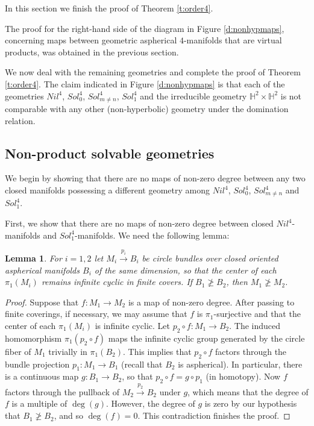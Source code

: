 \documentclass[12pt]{amsart}
\newtheorem{lem}[thm]{Lemma}
\theoremstyle{remark}
\begin{document}
In this section we finish the proof of Theorem \ref{t:order4}. 

The proof for the right-hand side of the diagram in Figure \ref{d:nonhypmaps}, concerning maps between geometric aspherical $4$-manifolds that are virtual products, was obtained in the previous section.

We now deal with the remaining geometries and complete the proof of Theorem \ref{t:order4}. The claim indicated in Figure \ref{d:nonhypmaps} is that
each of the geometries $Nil^4$, $Sol_0^4$, $Sol_{m \neq n}^4$, $Sol_1^4$ and the irreducible geometry $\mathbb{H}^2 \times \mathbb{H}^2$ is not comparable with any other
(non-hyperbolic) geometry under the domination relation.

\subsection{Non-product solvable geometries}

We begin by showing that there are no maps of non-zero degree between any two closed manifolds possessing a different geometry among $Nil^4$, $Sol_0^4$,
$Sol_{m \neq n}^4$ and $Sol_1^4$.

First, we show that there are no maps of non-zero degree between closed $Nil^4$-manifolds and $Sol_1^4$-manifolds. We need the following lemma:

\begin{lem}\label{l:factorizationbundles}
 For $i = 1,2$ let $M_i \stackrel{p_i}\longrightarrow B_i$ be circle bundles over closed oriented aspherical manifolds $B_i$ of the same dimension, so that the
center of each $\pi_1(M_i)$ remains infinite cyclic in finite covers. If $B_1 \ngeq B_2$, then $M_1 \ngeq M_2$. 
\end{lem}
\begin{proof}
 Suppose that $f \colon M_1 \longrightarrow M_2$ is a map of non-zero degree. After passing to finite coverings, if necessary, we may assume that $f$ is
$\pi_1$-surjective and that the center of each $\pi_1(M_i)$ is infinite cyclic. 
Let $p_2\circ f\colon M_1\longrightarrow B_2$. The induced homomorphism $\pi_1(p_2 \circ f)$ maps the infinite cyclic group generated by
the circle fiber of $M_1$ trivially in $\pi_1(B_2)$. This implies that $p_2 \circ f$ factors through the bundle projection $p_1 \colon M_1 \longrightarrow
B_1$ (recall that $B_2$ is aspherical). In particular, there is a continuous map $g \colon B_1 \longrightarrow B_2$, so that $p_2 \circ f = g \circ p_1$ (in homotopy).
Now $f$ factors through the pullback of $M_2\stackrel{p_2}\longrightarrow B_2$ under $g$, which means that the degree of $f$ is a multiple of $\deg (g)$. However, the degree of $g$ is zero by
our hypothesis that $B_1 \ngeq B_2$, and so $\deg(f)=0$. This contradiction finishes the proof.
\end{proof}
\end{document}
